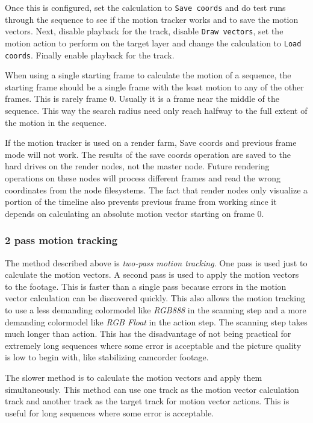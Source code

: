 Once this is configured, set the calculation to \texttt{Save coords} and do test runs through the sequence to see if the motion tracker works and to save the motion vectors. Next, disable playback for the track, disable \texttt{Draw vectors}, set the motion action to perform on the target layer and change the calculation to \texttt{Load coords}. Finally enable playback for the track.

When using a single starting frame to calculate the motion of a sequence, the starting frame should be a single frame with the least motion to any of the other frames. This is rarely frame $0$. Usually it is a frame near the middle of the sequence. This way the search radius need only reach halfway to the full extent of the motion in the sequence.

If the motion tracker is used on a render farm, Save coords and previous frame mode will not work. The results of the save coords operation are saved to the hard drives on the render nodes, not the master node. Future rendering operations on these nodes will process different frames and read the wrong coordinates from the node filesystems. The fact that render nodes only visualize a portion of the timeline also prevents previous frame from working since it depends on calculating an absolute motion vector starting on frame $0$.

\subsubsection*{2 pass motion tracking}
\label{ssub:2_pass_motion_tracking}

The method described above is \textit{two-pass motion tracking}. One pass is used just to calculate the motion vectors. A second pass is used to apply the motion vectors to the footage. This is faster than a single pass because errors in the motion vector calculation can be discovered quickly. This also allows the motion tracking to use a less demanding colormodel like \textit{RGB888} in the scanning step and a more demanding colormodel like \textit{RGB Float} in the action step. The scanning step takes much longer than action. This has the disadvantage of not being practical for extremely long sequences where some error is acceptable and the picture quality is low to begin with, like stabilizing camcorder footage.

The slower method is to calculate the motion vectors and apply them simultaneously. This method can use one track as the motion vector calculation track and another track as the target track for motion vector actions. This is useful for long sequences where some error is acceptable.


